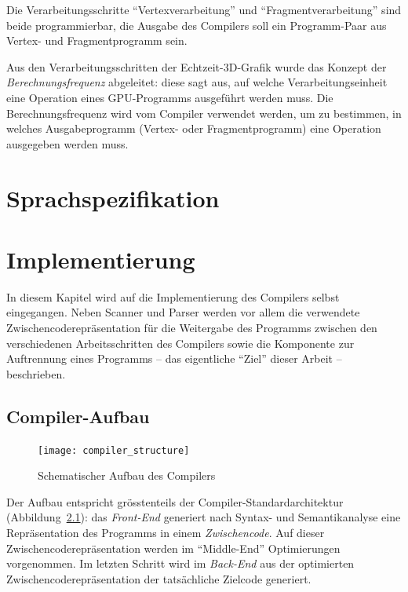 \documentclass[twoside,a4paper,fleqn,12pt]{book}
\begin{document}
Die Verarbeitungsschritte "`Vertexverarbeitung"' und "`Fragmentverarbeitung"' sind beide programmierbar, die Ausgabe des Compilers
soll ein Programm-Paar aus Vertex- und Fragmentprogramm sein.

Aus den Verarbeitungsschritten der Echtzeit-3D-Grafik wurde das Konzept der \emph{Berechnungsfrequenz} abgeleitet:
diese sagt aus, auf welche Verarbeitungseinheit eine Operation eines GPU-Programms ausgeführt werden muss.
Die Berechnungsfrequenz wird vom Compiler verwendet werden, um zu bestimmen,
in welches Ausgabeprogramm (Vertex- oder Fragmentprogramm) eine Operation ausgegeben werden muss.

\chapter{Sprachspezifikation}
\label{langspec}



\chapter{Implementierung}
\label{implementation}

In diesem Kapitel wird auf die Implementierung des Compilers selbst eingegangen. 
Neben Scanner und Parser werden vor allem die verwendete Zwischencoderepräsentation
für die Weitergabe des Programms zwischen den verschiedenen Arbeitsschritten des Compilers 
sowie die Komponente zur Auftrennung eines Programms -- das eigentliche "`Ziel"' dieser Arbeit -- beschrieben.

\section{Compiler-Aufbau}
\begin{figure}[h]
   \centering
  \texttt{[image: compiler\_structure]}
  \caption{Schematischer Aufbau des Compilers}
  \label{fig:structure}
\end{figure}

Der Aufbau entspricht grösstenteils der Compiler-Standardarchitektur (Abbildung~\ref{fig:structure}): das \emph{Front-End} generiert nach Syntax- und Semantikanalyse
eine Repräsentation des Programms in einem \emph{Zwischencode}. Auf dieser Zwischencoderepräsentation werden im "`Middle-End"' %
Optimierungen vorgenommen. Im letzten Schritt wird im \emph{Back-End} aus der optimierten Zwischencoderepräsentation der tatsächliche Zielcode generiert.
\end{document}

